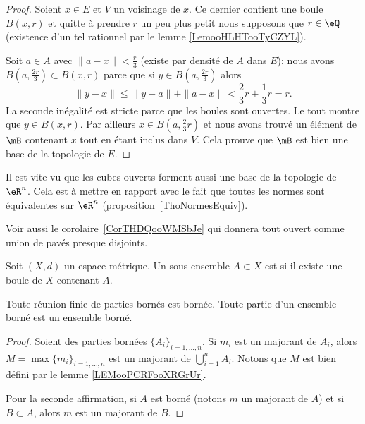\begin{proof}
	Soient \( x\in E\) et \( V\) un voisinage de \( x\). Ce dernier contient une boule \( B(x,r)\) et quitte à prendre \( r\) un peu plus petit nous supposons que \( r\in \eQ\) (existence d'un tel rationnel par le lemme \ref{LemooHLHTooTyCZYL}).

	Soit \( a\in A\) avec \( \| a-x \|<\frac{ r }{ 3 }\) (existe par densité de \( A\) dans \( E\)); nous avons \( B(a,\frac{ 2r }{ 3 })\subset B(x,r)\) parce que si \( y\in B( a,\frac{ 2r }{ 3 } )\) alors
	\begin{equation}
		\| y-x \|\leq \| y-a \|+\| a-x \|<\frac{ 2 }{ 3 }r+\frac{ 1 }{ 3 }r=r.
	\end{equation}
	La seconde inégalité est stricte parce que les boules sont ouvertes. Le tout montre que \( y\in B(x,r)\). Par ailleurs \( x\in B(a,\frac{ 2 }{ 3 }r)\) et nous avons trouvé un élément de \( \mB\) contenant \( x\) tout en étant inclus dans \( V\). Cela prouve que \( \mB\) est bien une base de la topologie de \( E\).
\end{proof}


\begin{remark}      \label{RemIPVLooHUXyeW}
	Il est vite vu que les cubes ouverts forment aussi une base de la topologie de \( \eR^n\). Cela est à mettre en rapport avec le fait que toutes les normes sont équivalentes sur \( \eR^n\) (proposition~\ref{ThoNormesEquiv}).


	Voir aussi le corolaire~\ref{CorTHDQooWMSbJe} qui donnera tout ouvert comme union de pavés presque disjoints.
\end{remark}

\begin{definition}\label{DefEnsembleBorne}
	Soit \( (X, d) \) un espace métrique. Un sous-ensemble \( A \subset X\) est  si il existe une boule de \( X\) contenant \( A\).
\end{definition}

\begin{proposition}     \label{PROPooJIOAooWqzKMu}
	Toute réunion finie de parties bornés est bornée. Toute partie d'un ensemble borné est un ensemble borné.
\end{proposition}

\begin{proof}
	Soient des parties bornées \( \{ A_i \}_{i=1,\ldots,n}\). Si \( m_i\) est un majorant de \( A_i\), alors \( M=\max\{ m_i \}_{i=1,\ldots,n}\) est un majorant de \( \bigcup_{i=1}^nA_i\). Notons que \( M\) est bien défini par le lemme \ref{LEMooPCRFooXRGrUr}.

	Pour la seconde affirmation, si \( A\) est borné (notons \( m\) un majorant de \( A\)) et si \( B\subset A\), alors \( m\) est un majorant de \( B\).
\end{proof}


